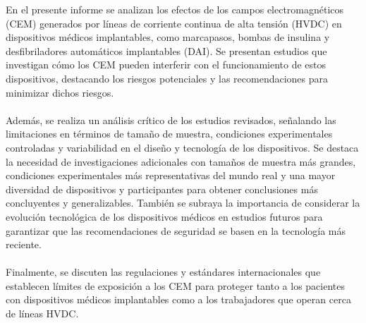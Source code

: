 \documentclass[
	spanish, %
	letterpaper, oneside
]{article}
\begin{document}
\templatePortrait

\templatePagecfg

\begin{abstractd}
En el presente informe se analizan los efectos de los campos electromagnéticos (CEM) generados por líneas de corriente continua de alta tensión (HVDC) en dispositivos médicos implantables, como marcapasos, bombas de insulina y desfibriladores automáticos implantables (DAI). Se presentan estudios que investigan cómo los CEM pueden interferir con el funcionamiento de estos dispositivos, destacando los riesgos potenciales y las recomendaciones para minimizar dichos riesgos.\\\\
Además, se realiza un análisis crítico de los estudios revisados, señalando las limitaciones en términos de tamaño de muestra, condiciones experimentales controladas y variabilidad en el diseño y tecnología de los dispositivos. Se destaca la necesidad de investigaciones adicionales con tamaños de muestra más grandes, condiciones experimentales más representativas del mundo real y una mayor diversidad de dispositivos y participantes para obtener conclusiones más concluyentes y generalizables. También se subraya la importancia de considerar la evolución tecnológica de los dispositivos médicos en estudios futuros para garantizar que las recomendaciones de seguridad se basen en la tecnología más reciente.\\\\
Finalmente, se discuten las regulaciones y estándares internacionales que establecen límites de exposición a los CEM para proteger tanto a los pacientes con dispositivos médicos implantables como a los trabajadores que operan cerca de líneas HVDC. 
\end{abstractd}

\templateIndex

\templateFinalcfg



\end{document}
